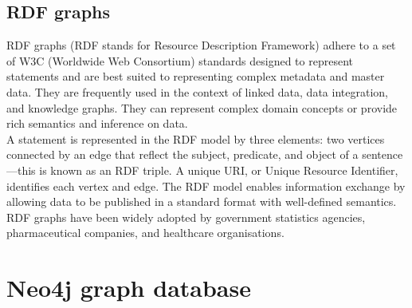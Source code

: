 \documentclass[paper=a4, fontsize=11pt]{scrartcl}
\numberwithin{equation}{section}		%
\numberwithin{figure}{section}			%
\numberwithin{table}{section}				%
\begin{document}
\subsection{RDF graphs}
RDF graphs (RDF stands for Resource Description Framework) adhere to a set of W3C (Worldwide Web Consortium) standards designed to represent statements and are best suited to representing complex metadata and master data. They are frequently used in the context of linked data, data integration, and knowledge graphs. They can represent complex domain concepts or provide rich semantics and inference on data.
\\
A statement is represented in the RDF model by three elements: two vertices connected by an edge that reflect the subject, predicate, and object of a sentence—this is known as an RDF triple. A unique URI, or Unique Resource Identifier, identifies each vertex and edge. The RDF model enables information exchange by allowing data to be published in a standard format with well-defined semantics. RDF graphs have been widely adopted by government statistics agencies, pharmaceutical companies, and healthcare organisations.

\newpage
\section{Neo4j graph database}
\end{document}
